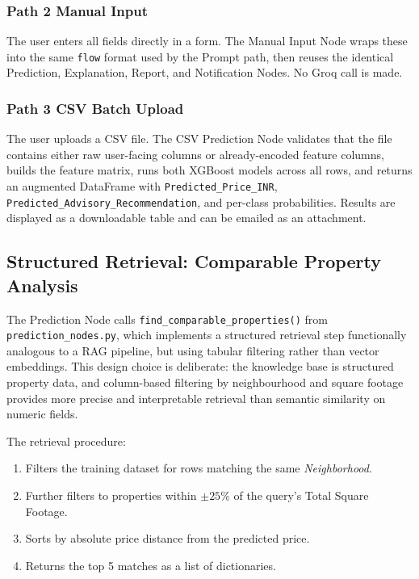 \documentclass[12pt,a4paper]{article}
\begin{document}
\subsubsection{Path 2 \textemdash{} Manual Input}

The user enters all fields directly in a form. The Manual Input Node wraps these into the same \texttt{flow} format used by the Prompt path, then reuses the identical Prediction, Explanation, Report, and Notification Nodes. No Groq call is made.

\subsubsection{Path 3 \textemdash{} CSV Batch Upload}

The user uploads a CSV file. The CSV Prediction Node validates that the file contains either raw user-facing columns or already-encoded feature columns, builds the feature matrix, runs both XGBoost models across all rows, and returns an augmented DataFrame with \texttt{Predicted\_Price\_INR}, \texttt{Predicted\_Advisory\_Recommendation}, and per-class probabilities. Results are displayed as a downloadable table and can be emailed as an attachment.

\subsection{Structured Retrieval: Comparable Property Analysis}

The Prediction Node calls \texttt{find\_comparable\_properties()} from \texttt{prediction\_nodes.py}, which implements a structured retrieval step functionally analogous to a RAG pipeline, but using tabular filtering rather than vector embeddings. This design choice is deliberate: the knowledge base is structured property data, and column-based filtering by neighbourhood and square footage provides more precise and interpretable retrieval than semantic similarity on numeric fields.

The retrieval procedure:
\begin{enumerate}[label=\arabic*., leftmargin=*, itemsep=3pt]
  \item Filters the training dataset for rows matching the same \textit{Neighborhood}.
  \item Further filters to properties within $\pm 25\%$ of the query's Total Square Footage.
  \item Sorts by absolute price distance from the predicted price.
  \item Returns the top 5 matches as a list of dictionaries.
\end{enumerate}
\end{document}
